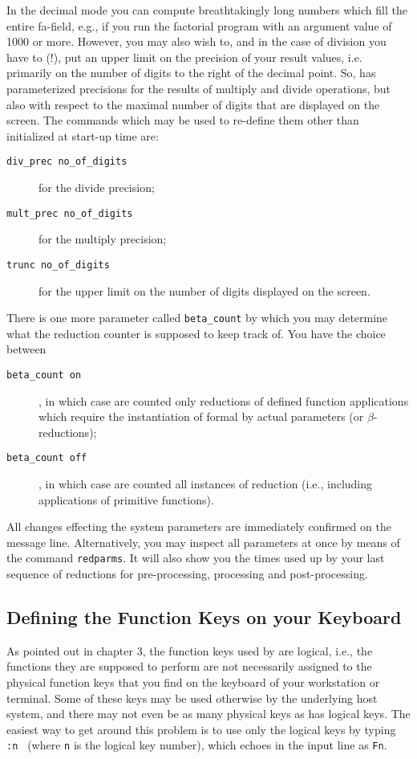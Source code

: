 In the decimal mode you can compute
breathtakingly long numbers which fill the entire {\sc fa}-field,
e.g., if you run the factorial program with an argument value of 1000
or more. However, you may also wish to, and in the case of division you have
to (!), put an upper limit on the precision of your result values,
 i.e. primarily on the number of digits to the right of the decimal point.
So, \pired has parameterized precisions for the results of 
multiply and divide operations, but also with respect to the maximal number of
digits that are displayed on the screen. The commands which may be used to
re-define them other than initialized at start-up time are:
\begin{description}
\item[{\tt div\_prec no\_of\_digits}] for the divide precision;
\item[{\tt mult\_prec no\_of\_digits}] for the multiply precision;
\item[{\tt trunc no\_of\_digits}] for the upper limit on
the number of digits
displayed on the screen.
\end{description}
There is one more parameter called {\tt beta\_count} by which you may
determine what the {\mys reduction counter} is supposed to keep track of. You have
the choice between
\begin{description}
\item[{\tt beta\_count on}], in which case are counted  only reductions of
 defined function applications which require
 the instantiation of formal by actual parameters (or $\beta$-reductions);
\item[{\tt beta\_count off}], in which case are counted all instances of
reduction (i.e., including applications of primitive functions).
\end{description}
All changes effecting the system parameters are immediately confirmed
on the message line. Alternatively, you may inspect all parameters at
once by means of the command {\tt redparms}. It will also show you
the times used up by your last sequence of reductions for pre-processing,
processing and post-processing.

\subsection{Defining the Function Keys on your Keyboard}

As pointed out in chapter 3, the function keys used by \pired are
{\mys logical}, i.e., the functions they are supposed to perform
are not necessarily assigned to the {\mys physical 
function keys} that you find on
the keyboard of your workstation or terminal. Some of these keys
may be used otherwise by the underlying host system, and there
may not even be as many physical keys as \pired has logical keys.
The easiest way to get around this problem is to use only the
logical keys by typing {\tt :n } (where {\tt n} is the logical key
number), which echoes in the input line as {\tt Fn}.

